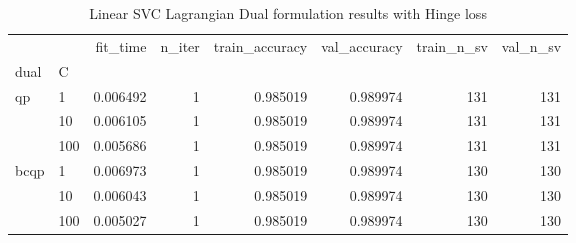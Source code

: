 \begin{table}[H]
\centering
\caption{Linear SVC Lagrangian Dual formulation results with Hinge loss}
\label{linear_lagrangian_dual_svc_cv_results}
\begin{tabular}{llrrrrrr}
\toprule
     &     &  fit\_time &  n\_iter &  train\_accuracy &  val\_accuracy &  train\_n\_sv &  val\_n\_sv \\
dual & C &           &         &                 &               &             &           \\
\midrule
qp & 1   &  0.006492 &       1 &        0.985019 &      0.989974 &         131 &       131 \\
     & 10  &  0.006105 &       1 &        0.985019 &      0.989974 &         131 &       131 \\
     & 100 &  0.005686 &       1 &        0.985019 &      0.989974 &         131 &       131 \\
bcqp & 1   &  0.006973 &       1 &        0.985019 &      0.989974 &         130 &       130 \\
     & 10  &  0.006043 &       1 &        0.985019 &      0.989974 &         130 &       130 \\
     & 100 &  0.005027 &       1 &        0.985019 &      0.989974 &         130 &       130 \\
\bottomrule
\end{tabular}
\end{table}
